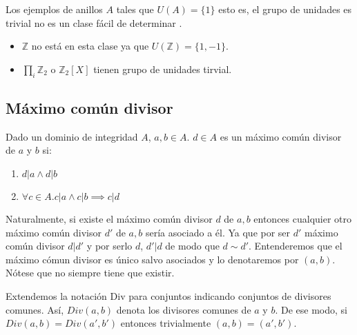 \begin{example}
Los ejemplos de anillos $A$ tales que $U(A) = \{1\}$ esto es, el grupo de unidades es trivial no es un clase fácil de determinar \cite{link1}. 

\begin{itemize}
\item $\mathbb{Z}$ no está en esta clase ya que $U(\mathbb{Z}) = \{1,-1\}$.
\item $\prod_i \mathbb{Z}_2$ o $\mathbb{Z}_2[X]$ tienen grupo de unidades tirvial.
\end{itemize}  
\end{example}

\subsection{Máximo común divisor}

\begin{definition}
Dado un dominio de integridad $A$, $a,b \in A$. $d \in A$ es un máximo común divisor de $a$ y $b$ si:
	
\begin{enumerate}
\item $d | a \land d|b$
\item $\forall c \in A.c|a \land c|b \implies c|d$	\end{enumerate}

Naturalmente, si existe el máximo común divisor $d$ de $a,b$ entonces cualquier otro máximo común divisor $d'$ de $a,b$ sería asociado a él. Ya que por ser $d'$ máximo común divisor $d|d'$ y por serlo $d$, $d'|d$ de modo que $d \sim d'$. Entenderemos que el máximo cómun divisor es único salvo asociados y lo denotaremos por $(a,b)$. Nótese que no siempre tiene que existir.  
\end{definition}

Extendemos la notación Div para conjuntos indicando conjuntos de divisores comunes. Así, $Div(a,b)$ denota los divisores comunes de $a$ y $b$. De ese modo, si $Div(a,b) = Div(a',b')$ entonces trivialmente $(a,b) = (a',b')$.

